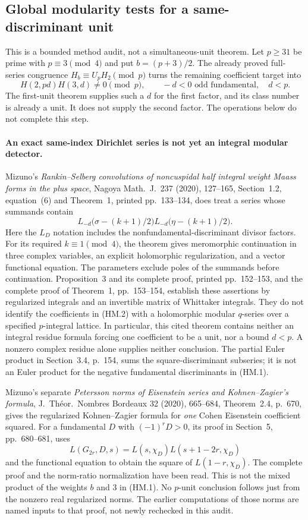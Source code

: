 \subsection{Global modularity tests for a same-discriminant unit}
\label{sec:hadamard-modularity-scope}

This is a bounded method audit, not a simultaneous-unit theorem.  Let
$p\ge31$ be prime with $p\equiv3\pmod4$ and put $b=(p+3)/2$.
The already proved full-series congruence
$H_b\equiv U_pH_2\pmod p$ turns the remaining coefficient target into
\[
 H(2,pd)H(3,d)\ne0\pmod p,
 \qquad -d<0\text{ odd fundamental},\quad d<p.
 \tag{HM.1}
\]
The first-unit theorem supplies such a $d$ for the first factor, and its
class number is already a unit.  It does not supply the second factor.
The operations below do not complete this step.

\paragraph{An exact same-index Dirichlet series is not yet an integral
modular detector.}
Mizuno's \emph{Rankin--Selberg convolutions of noncuspidal half integral
weight Maass forms in the plus space}, Nagoya Math.\ J.\ 237 (2020),
127--165, Section~1.2, equation~(6) and Theorem~1, printed pp.~133--134,
does treat a series whose summands contain
\[
 L_{-d}\bigl(\sigma-(k+1)/2\bigr)
 L_{-d}\bigl(\eta-(k+1)/2\bigr).
 \tag{HM.2}
\]
Here the $L_D$ notation includes the nonfundamental-discriminant divisor
factors.  For its required $k\equiv1\pmod4$, the theorem gives
meromorphic continuation in three complex
variables, an explicit holomorphic regularization, and a vector functional
equation.  The parameters exclude poles of the summands before continuation.
Proposition~3 and its complete proof, printed pp.~152--153, and the
complete proof of Theorem~1, pp.~153--154, establish these assertions by
regularized integrals and an invertible matrix of Whittaker integrals.
They do not identify the coefficients in (HM.2) with a holomorphic
modular $q$-series over a specified $p$-integral lattice.  In particular,
this cited theorem contains neither an integral residue formula forcing
one coefficient to be a unit, nor a bound $d<p$.  A nonzero complex
residue alone supplies neither conclusion.  The partial Euler product
in Section~3.4, p.~154, sums the square-discriminant subseries; it is not
an Euler product for the negative fundamental discriminants in (HM.1).

Mizuno's separate \emph{Petersson norms of Eisenstein series and
Kohnen--Zagier's formula}, J.\ Th\'eor.\ Nombres Bordeaux 32 (2020), 665--684,
Theorem~2.4, p.~670, gives the regularized Kohnen--Zagier formula for
\emph{one} Cohen Eisenstein coefficient squared.  For a fundamental $D$
with $(-1)^rD>0$, its proof in Section~5, pp.~680--681, uses
\[
 L(G_{2r},D,s)=L(s,\chi_D)L(s+1-2r,\chi_D)
 \tag{HM.3}
\]
and the functional equation to obtain the square of $L(1-r,\chi_D)$.
The complete proof and the norm-ratio normalization have been read.
This is not the mixed product of the weights $b$ and $3$ in (HM.1).
No $p$-unit conclusion follows just from the nonzero real regularized
norms.  The earlier computations of those norms are named inputs to
that proof, not newly rechecked in this audit.

